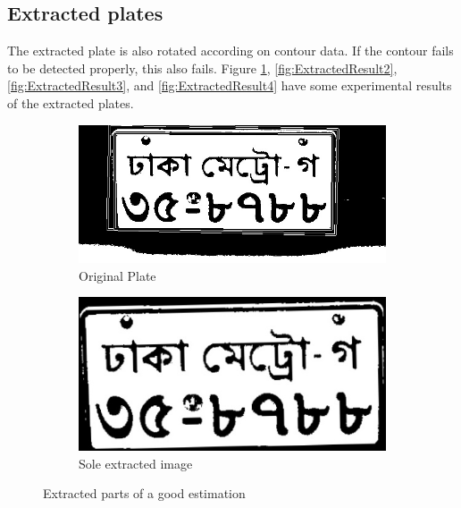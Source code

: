 \subsection{Extracted plates}
The extracted plate is also rotated according on contour data. If the contour fails to be detected properly, this also fails. Figure \ref{fig:ExtractedResult1}, \ref{fig:ExtractedResult2}, \ref{fig:ExtractedResult3}, and \ref{fig:ExtractedResult4} have some experimental results of the extracted plates.

\begin{figure}
\begin{subfigure}{0.5\textwidth}
    \centering
    \includegraphics[width=0.9\linewidth]{./img/experiment/stage.12/00-good}
    \caption{Original Plate}
\end{subfigure}
\begin{subfigure}{0.5\textwidth}
    \centering
    \includegraphics[width=0.9\linewidth]{./img/experiment/stage.13/00-00-good}
    \caption{Sole extracted image}
\end{subfigure}
\caption{Extracted parts of a good estimation}
\label{fig:ExtractedResult1}
\end{figure}

